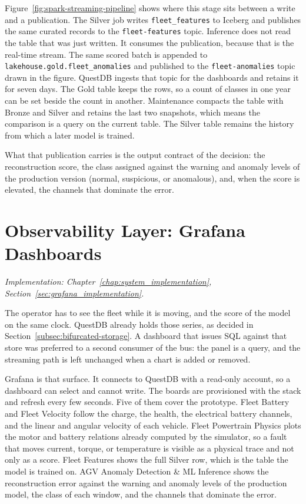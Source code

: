 Figure~\ref{fig:spark-streaming-pipeline} shows where this stage sits between a write and a publication. The Silver job writes \texttt{fleet\_features} to Iceberg and publishes the same curated records to the \texttt{fleet-features} topic. Inference does not read the table that was just written. It consumes the publication, because that is the real-time stream. The same scored batch is appended to \texttt{lakehouse.gold.fleet\_anomalies} and published to the \texttt{fleet-anomalies} topic drawn in the figure. QuestDB ingests that topic for the dashboards and retains it for seven days. The Gold table keeps the rows, so a count of classes in one year can be set beside the count in another. Maintenance compacts the table with Bronze and Silver and retains the last two snapshots, which means the comparison is a query on the current table. The Silver table remains the history from which a later model is trained.

What that publication carries is the output contract of the decision: the reconstruction score, the class assigned against the warning and anomaly levels of the production version (normal, suspicious, or anomalous), and, when the score is elevated, the channels that dominate the error.

\section{Observability Layer: Grafana Dashboards}
\label{sec:arch_observability}
\textit{Implementation: Chapter~\ref{chap:system_implementation}, Section~\ref{sec:grafana_implementation}.}

The operator has to see the fleet while it is moving, and the score of the model on the same clock. QuestDB already holds those series, as decided in Section~\ref{subsec:bifurcated-storage}. A dashboard that issues SQL against that store was preferred to a second consumer of the bus: the panel is a query, and the streaming path is left unchanged when a chart is added or removed.

Grafana is that surface. It connects to QuestDB with a read-only account, so a dashboard can select and cannot write. The boards are provisioned with the stack and refresh every few seconds. Five of them cover the prototype. Fleet Battery and Fleet Velocity follow the charge, the health, the electrical battery channels, and the linear and angular velocity of each vehicle. Fleet Powertrain Physics plots the motor and battery relations already computed by the simulator, so a fault that moves current, torque, or temperature is visible as a physical trace and not only as a score. Fleet Features shows the full Silver row, which is the table the model is trained on. AGV Anomaly Detection \& ML Inference shows the reconstruction error against the warning and anomaly levels of the production model, the class of each window, and the channels that dominate the error.

